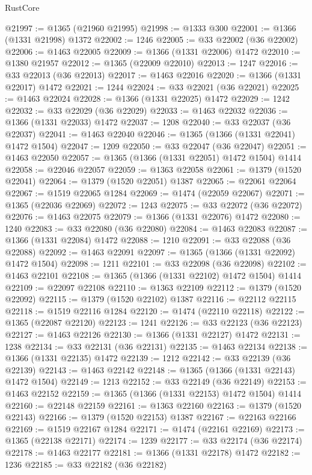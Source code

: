 \begin{lexlean}{RustCore}
\begin{coremodule}
@21997 := @1365 (@21960 @21995)
@21998 := @1333 @300
@22001 := @1366 (@1331 @21998) @1372
@22002 := 1246
@22005 := @33 @22002 (@36 @22002)
@22006 := @1463 @22005
@22009 := @1366 (@1331 @22006) @1472
@22010 := @1380 @21957
@22012 := @1365 (@22009 @22010)
@22013 := 1247
@22016 := @33 @22013 (@36 @22013)
@22017 := @1463 @22016
@22020 := @1366 (@1331 @22017) @1472
@22021 := 1244
@22024 := @33 @22021 (@36 @22021)
@22025 := @1463 @22024
@22028 := @1366 (@1331 @22025) @1472
@22029 := 1242
@22032 := @33 @22029 (@36 @22029)
@22033 := @1463 @22032
@22036 := @1366 (@1331 @22033) @1472
@22037 := 1208
@22040 := @33 @22037 (@36 @22037)
@22041 := @1463 @22040
@22046 := @1365 (@1366 (@1331 @22041) @1472 @1504)
@22047 := 1209
@22050 := @33 @22047 (@36 @22047)
@22051 := @1463 @22050
@22057 := @1365 (@1366 (@1331 @22051) @1472 @1504) @1414
@22058 := @22046 @22057
@22059 := @1363 @22058
@22061 := @1379 (@1520 @22041)
@22064 := @1379 (@1520 @22051) @1387
@22065 := @22061 @22064
@22067 := @1519 @22065 @1284
@22069 := @1474 (@22059 @22067)
@22071 := @1365 (@22036 @22069)
@22072 := 1243
@22075 := @33 @22072 (@36 @22072)
@22076 := @1463 @22075
@22079 := @1366 (@1331 @22076) @1472
@22080 := 1240
@22083 := @33 @22080 (@36 @22080)
@22084 := @1463 @22083
@22087 := @1366 (@1331 @22084) @1472
@22088 := 1210
@22091 := @33 @22088 (@36 @22088)
@22092 := @1463 @22091
@22097 := @1365 (@1366 (@1331 @22092) @1472 @1504)
@22098 := 1211
@22101 := @33 @22098 (@36 @22098)
@22102 := @1463 @22101
@22108 := @1365 (@1366 (@1331 @22102) @1472 @1504) @1414
@22109 := @22097 @22108
@22110 := @1363 @22109
@22112 := @1379 (@1520 @22092)
@22115 := @1379 (@1520 @22102) @1387
@22116 := @22112 @22115
@22118 := @1519 @22116 @1284
@22120 := @1474 (@22110 @22118)
@22122 := @1365 (@22087 @22120)
@22123 := 1241
@22126 := @33 @22123 (@36 @22123)
@22127 := @1463 @22126
@22130 := @1366 (@1331 @22127) @1472
@22131 := 1238
@22134 := @33 @22131 (@36 @22131)
@22135 := @1463 @22134
@22138 := @1366 (@1331 @22135) @1472
@22139 := 1212
@22142 := @33 @22139 (@36 @22139)
@22143 := @1463 @22142
@22148 := @1365 (@1366 (@1331 @22143) @1472 @1504)
@22149 := 1213
@22152 := @33 @22149 (@36 @22149)
@22153 := @1463 @22152
@22159 := @1365 (@1366 (@1331 @22153) @1472 @1504) @1414
@22160 := @22148 @22159
@22161 := @1363 @22160
@22163 := @1379 (@1520 @22143)
@22166 := @1379 (@1520 @22153) @1387
@22167 := @22163 @22166
@22169 := @1519 @22167 @1284
@22171 := @1474 (@22161 @22169)
@22173 := @1365 (@22138 @22171)
@22174 := 1239
@22177 := @33 @22174 (@36 @22174)
@22178 := @1463 @22177
@22181 := @1366 (@1331 @22178) @1472
@22182 := 1236
@22185 := @33 @22182 (@36 @22182)

\end{coremodule}
\end{lexlean}
